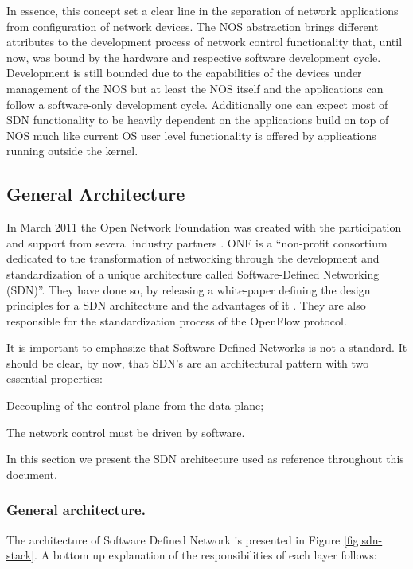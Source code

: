 In essence, this concept set a clear line in the separation of network applications
from configuration of network devices. The NOS abstraction brings different attributes to the development process of
network control functionality that, until now, was bound by the hardware and respective
software development cycle. Development is still bounded due to the
capabilities of the devices under management of the NOS but at least
the NOS itself and the applications can follow a software-only
development cycle. Additionally one can expect most of SDN functionality to be
heavily dependent   on the applications build on top of NOS much like
current  OS user level functionality is offered by applications
running outside the kernel.


\subsection{General Architecture}
In March 2011 the Open Network Foundation was created with the
participation and support from several industry partners \cite{onf}. ONF  is a ``non-profit consortium
dedicated to the transformation of networking through the development
and standardization of a unique architecture called Software-Defined
Networking (SDN)''. They have done so, by releasing a white-paper
defining the design principles for a SDN architecture and the
advantages of it \cite{ONF:2012ui}. They are also responsible for the standardization
process of the OpenFlow protocol.

It is important to emphasize that Software Defined Networks is not a
standard. It should be
clear, by now, that SDN's are an architectural pattern with two
essential properties:

\begin{itemize*}
\item Decoupling of the control plane from the data plane;
\item The network control must be driven by software.
\end{itemize*}

In this section we present the SDN architecture used as reference throughout this document.  

\subsubsection{General architecture.} The architecture of Software Defined Network is presented in Figure
\ref{fig:sdn-stack}. A bottom up explanation of the responsibilities of
each layer follows:

